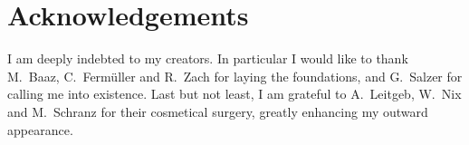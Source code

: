 \documentclass{article}
\begin{document}
\section*{Acknowledgements}

I am deeply indebted to my creators. In particular I would like to thank
M.~Baaz, C.~Ferm\"uller and R.~Zach for laying the foundations, and G.~Salzer
for calling me into existence. Last but not least, I am grateful to
A.~Leitgeb, W.~Nix and M.~Schranz for their cosmetical surgery,
greatly enhancing my outward appearance.


\end{document}
